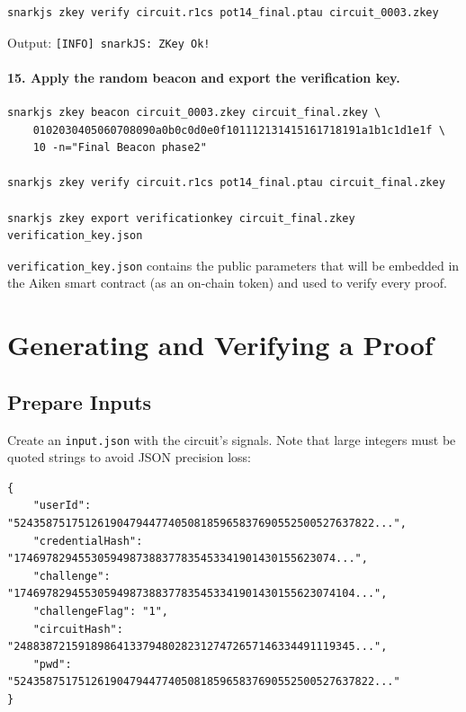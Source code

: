 \begin{verbatim}
snarkjs zkey verify circuit.r1cs pot14_final.ptau circuit_0003.zkey
\end{verbatim}

Output: \texttt{[INFO] snarkJS: ZKey Ok!}

\paragraph{15. Apply the random beacon and export the verification key.}

\begin{verbatim}
snarkjs zkey beacon circuit_0003.zkey circuit_final.zkey \
    0102030405060708090a0b0c0d0e0f101112131415161718191a1b1c1d1e1f \
    10 -n="Final Beacon phase2"

snarkjs zkey verify circuit.r1cs pot14_final.ptau circuit_final.zkey

snarkjs zkey export verificationkey circuit_final.zkey verification_key.json
\end{verbatim}

\texttt{verification\_key.json} contains the public parameters that will be embedded in the Aiken smart contract (as an on-chain token) and used to verify every proof.

\section{Generating and Verifying a Proof} \label{sec:proof-gen}

\subsection*{Prepare Inputs}

Create an \texttt{input.json} with the circuit's signals. Note that large integers must be quoted strings to avoid JSON precision loss:

\begin{verbatim}
{
    "userId": "52435875175126190479447740508185965837690552500527637822...",
    "credentialHash": "17469782945530594987388377835453341901430155623074...",
    "challenge": "17469782945530594987388377835453341901430155623074104...",
    "challengeFlag": "1",
    "circuitHash": "24883872159189864133794802823127472657146334491119345...",
    "pwd": "52435875175126190479447740508185965837690552500527637822..."
}
\end{verbatim}

